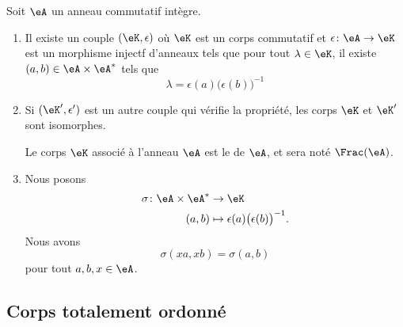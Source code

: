 \begin{theoremDef}     \label{ThogbhWgo}
    Soit \( \eA\) un anneau commutatif intègre.

    \begin{enumerate}
        \item
    Il existe un couple \( (\eK,\epsilon)\) où \( \eK\) est un corps commutatif et \( \epsilon\colon \eA\to \eK\) est un morphisme injectf d'anneaux tels que pour tout \( \lambda\in\eK\), il existe \( (a,b)\in \eA\times \eA^*\) tels que
    \begin{equation}
        \lambda=\epsilon(a)\big( \epsilon(b) \big)^{-1}
    \end{equation}
\item
    Si \( (\eK',\epsilon')\) est un autre couple qui vérifie la propriété, les corps \( \eK\) et \( \eK'\) sont isomorphes.

    Le corps \( \eK\) associé à l'anneau \( \eA\) est le  de \( \eA\), et sera noté \( \Frac(\eA)\).

\item
    Nous posons
    \begin{equation}
        \begin{aligned}
            \sigma\colon \eA\times \eA^*&\to \eK \\
            (a,b)&\mapsto \epsilon(a)\big( \epsilon(b) \big)^{-1}. 
        \end{aligned}
    \end{equation}
    Nous avons
    \begin{equation}
        \sigma(xa, xb)=\sigma(a,b)
    \end{equation}
    pour tout \( a,b,x\in \eA\).
    \end{enumerate}
\end{theoremDef}

\subsection{Corps totalement ordonné}

